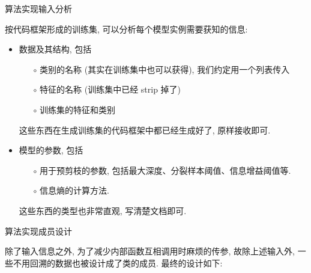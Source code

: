 \begin{frame}{算法实现}{输入分析}

\vspace{-0.2cm}

按代码框架形成的训练集, 可以分析每个模型实例需要获知的信息:

\begin{itemize}
\item 数据及其结构, 包括
\begin{itemize}\setlength{\itemindent}{-1em}
\item[$\circ$] 类别的名称 (其实在训练集中也可以获得), 我们约定用一个列表传入
\item[$\circ$] 特征的名称 (训练集中已经 strip 掉了)
\item[$\circ$] 训练集的特征和类别
\end{itemize}

这些东西在生成训练集的代码框架中都已经生成好了, 原样接收即可.

\item 模型的参数, 包括
\begin{itemize}\setlength{\itemindent}{-1em}
\item[$\circ$] 用于预剪枝的参数, 包括最大深度、分裂样本阈值、信息增益阈值等.
\item[$\circ$] 信息熵的计算方法.
\end{itemize}

这些东西的类型也非常直观, 写清楚文档即可.
\end{itemize}

\end{frame}

\begin{frame}{算法实现}{成员设计}

\vspace{-0.2cm}

除了输入信息之外, 为了减少内部函数互相调用时麻烦的传参, 故除上述输入外, 一些不用回溯的数据也被设计成了类的成员. 最终的设计如下:

\begin{figure}[bth]
\end{figure}

\end{frame}


